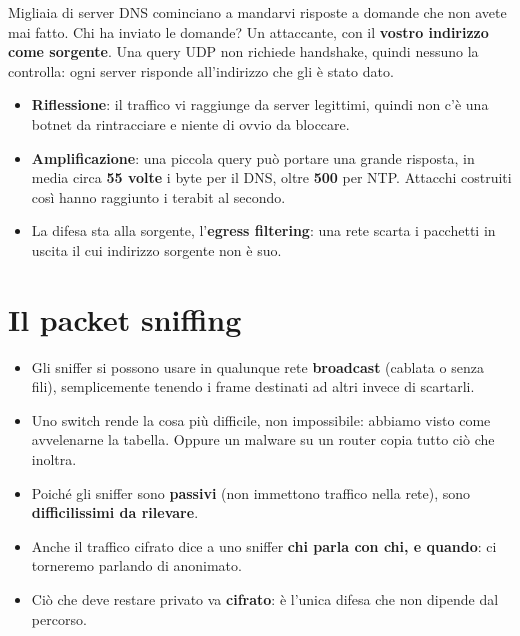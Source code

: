 Migliaia di server DNS cominciano a mandarvi risposte a domande che non avete mai fatto. Chi ha inviato le domande? Un attaccante, con
il \textbf{vostro indirizzo come sorgente}. Una query UDP non richiede handshake, quindi nessuno la controlla: ogni server risponde
all'indirizzo che gli è stato dato.

\begin{itemize}
    \item \textbf{Riflessione}: il traffico vi raggiunge da server legittimi, quindi non c'è una botnet da rintracciare e niente di
          ovvio da bloccare.
    \item \textbf{Amplificazione}: una piccola query può portare una grande risposta, in media circa \textbf{55 volte} i byte per il
          DNS, oltre \textbf{500} per NTP. Attacchi costruiti così hanno raggiunto i terabit al secondo.
    \item La difesa sta alla sorgente, l'\textbf{egress filtering}: una rete scarta i pacchetti in uscita il cui indirizzo sorgente non
          è suo.
\end{itemize}

\section{Il packet sniffing}


\begin{itemize}
    \item Gli sniffer si possono usare in qualunque rete \textbf{broadcast} (cablata o senza fili), semplicemente tenendo i frame
          destinati ad altri invece di scartarli.
    \item Uno switch rende la cosa più difficile, non impossibile: abbiamo visto come avvelenarne la tabella. Oppure un malware su un
          router copia tutto ciò che inoltra.
    \item Poiché gli sniffer sono \textbf{passivi} (non immettono traffico nella rete), sono \textbf{difficilissimi da rilevare}.
    \item Anche il traffico cifrato dice a uno sniffer \textbf{chi parla con chi, e quando}: ci torneremo parlando di anonimato.
    \item Ciò che deve restare privato va \textbf{cifrato}: è l'unica difesa che non dipende dal percorso.
\end{itemize}

